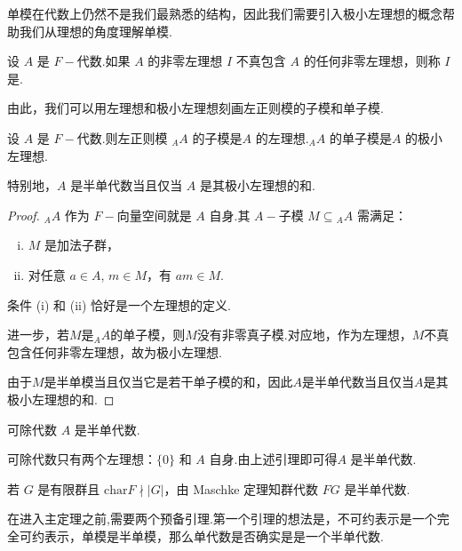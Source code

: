 单模在代数上仍然不是我们最熟悉的结构，因此我们需要引入极小左理想的概念帮助我们从理想的角度理解单模.
\begin{definition}[极小左理想]
设 $A$ 是 $F-\!\!$代数.如果 $A$ 的非零左理想 $I$ 不真包含 $A$ 的任何非零左理想，则称 $I$ 是.
\end{definition}

由此，我们可以用左理想和极小左理想刻画左正则模的子模和单子模.

\begin{lemma}
设 $A$ 是 $F-\!\!$代数.则左正则模 ${}_A A$ 的子模是$A$ 的左理想.${}_A A$ 的单子模是$A$ 的极小左理想. \par
特别地，$A$ 是半单代数当且仅当 $A$ 是其极小左理想的和.
\end{lemma}
\begin{proof}
${}_A A$ 作为 $F-\!\!$向量空间就是 $A$ 自身.其 $A-\!\!$子模 $M \subseteq {}_A A$ 需满足：
\begin{enumerate}[(i)]
    \item $M$ 是加法子群，
    \item 对任意 $a \in A$, $m \in M$，有 $a m \in M$.
\end{enumerate}
条件 (i) 和 (ii) 恰好是一个左理想的定义.\par
进一步，若$M$是${}_A A$的单子模，则$M$没有非零真子模.对应地，作为左理想，$M$不真包含任何非零左理想，故为极小左理想.\par
由于$M$是半单模当且仅当它是若干单子模的和，因此$A$是半单代数当且仅当$A$是其极小左理想的和.
\end{proof}

\begin{instance}
    可除代数 $A$ 是半单代数.\par
    可除代数只有两个左理想：$\{0\}$ 和 $A$ 自身.由上述引理即可得$A$ 是半单代数.
\end{instance}

\begin{instance}
    若 $G$ 是有限群且 $\mathrm{char}F \nmid |G|$，由 Maschke 定理知群代数 $FG$ 是半单代数.
\end{instance}



在进入主定理之前,需要两个预备引理.第一个引理的想法是，不可约表示是一个完全可约表示，单模是半单模，那么单代数是否确实是是一个半单代数.

